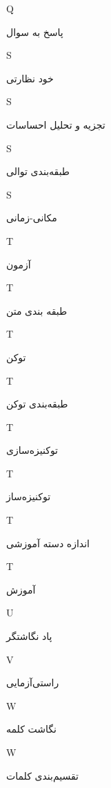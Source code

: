 \begin{center}
Q
\end{center}
	 \dotfill 	پاسخ به سوال \\ 
\begin{center}
S
\end{center}
	 \dotfill 	خود نظارتی \\ 
\begin{center}
S
\end{center}
	 \dotfill 	تجزیه و تحلیل احساسات \\ 
\begin{center}
S
\end{center}
	 \dotfill 	طبقه‌بندی توالی \\ 
\begin{center}
S
\end{center}
	 \dotfill 	مکانی-زمانی \\ 
\begin{center}
T
\end{center}
	 \dotfill 	آزمون \\ 
\begin{center}
T
\end{center}
	 \dotfill 	طبقه بندی متن \\ 
\begin{center}
T
\end{center}
	 \dotfill 	توکن \\ 
\begin{center}
T
\end{center}
	 \dotfill 	طبقه‌بندی توکن \\ 
\begin{center}
T
\end{center}
	 \dotfill 	توکنیزه‌سازی \\ 
\begin{center}
T
\end{center}
	 \dotfill 	توکنیزه‌ساز \\ 
\begin{center}
T
\end{center}
	 \dotfill 	اندازه دسته آموزشی \\ 
\begin{center}
T
\end{center}
	 \dotfill 	آموزش \\ 
\begin{center}
U
\end{center}
	 \dotfill 	پاد نگاشتگر \\ 
\begin{center}
V
\end{center}
	 \dotfill 	راستی‌آزمایی \\ 
\begin{center}
W
\end{center}
	 \dotfill 	نگاشت‌ کلمه \\ 
\begin{center}
W
\end{center}
	 \dotfill 	تقسیم‌بندی کلمات \\ 
